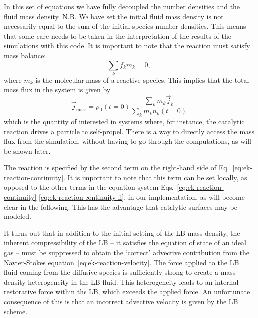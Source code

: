 In this set of equations we have fully decoupled the number densities and the
fluid mass density. N.B. We have set the initial fluid mass density is not necessarily 
equal to the sum of the initial species number densities. This means that 
some care needs to be taken in the interpretation of the results of the 
simulations with this code. It is important to note that the reaction must 
satisfy mass balance:
\begin{equation}
\label{eq:ek-mass-balance} \sum_{k} f_{k} m_{k} = 0 ,
\end{equation}
where $m_{k}$ is the molecular mass of a reactive species. This implies that the
total mass flux in the system is given by
\begin{equation}
\label{eq:ek-mass-flux} \vec{j}_{\mathrm{mass}} = \rho_{\mathrm{fl}}(t = 0) \frac{\sum_{k} m_{k} \vec{j}_{k}}{\sum_{k} m_{k} n_{k} (t = 0)}
\end{equation}
which is the quantity of interested in systems where, for instance, the
catalytic reaction drives a particle to self-propel. There is a way to directly 
access the mass flux from the simulation, without having to go through the
computations, as will be shown later.

The reaction is specified by the second term on the right-hand side of 
Eq.~\eqref{eq:ek-reaction-continuity}. It is important to note that this term
can be set locally, as opposed to the other terms in the equation system 
Eqs.~\eqref{eq:ek-reaction-continuity}-\eqref{eq:ek-reaction-continuity-fl}, in
our implementation, as will become clear in the following. This has the
advantage that catalytic surfaces may be modeled. 

It turns out that in addition to the initial setting of the LB mass density, the
inherent compressibility of the LB -- it satisfies the equation of state of an 
ideal gas -- must be suppressed to obtain the `correct' advective contribution
from the Navier-Stokes equation~\eqref{eq:ek-reaction-velocity}. The force 
applied to the LB fluid coming from the diffusive species is sufficiently
strong to create a mass density heterogeneity in the LB fluid. This 
heterogeneity leads to an internal restorative force within the LB, which
exceeds the applied force. An unfortunate consequence of this is that an 
incorrect advective velocity is given by the LB scheme.


